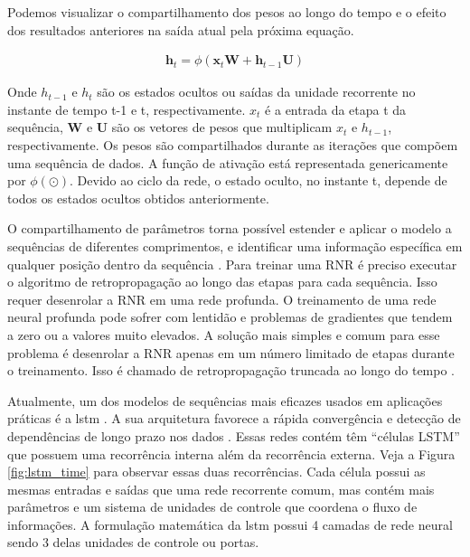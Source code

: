 Podemos visualizar o compartilhamento dos pesos ao longo do tempo e o efeito dos resultados anteriores na saída atual pela próxima equação. 

\begin{equation}
\label{eq:memoria}
\begin{aligned}
\textbf{h}_{t} =  \phi( \textbf{x}_{t} \textbf{W} + \textbf{h}_{t-1} \textbf{U}) 
\end{aligned}
\end{equation}

Onde  $h_{t-1}$ e $h_{t}$ são os estados ocultos ou saídas da unidade recorrente no instante de tempo t-1 e t, respectivamente.  $x_{t}$ é a entrada da etapa  t da sequência, $\textbf{W}$ e $\textbf{U}$ são os vetores de pesos que multiplicam $x_{t}$ e $h_{t-1}$, respectivamente. Os pesos são compartilhados durante as iterações que compõem uma sequência de dados. A função de ativação está representada genericamente por $\phi \left( \odot \right)$. Devido ao ciclo da rede, o estado oculto, no instante t, depende de todos os estados ocultos obtidos anteriormente.  

O compartilhamento de parâmetros torna possível estender e aplicar o modelo a sequências de diferentes comprimentos, e identificar uma informação específica em qualquer posição dentro da sequência \cite{Goodfellow2016}. 
Para treinar uma RNR é preciso executar o algoritmo de retropropagação ao longo das etapas para cada sequência. Isso requer desenrolar a RNR em uma rede profunda. O treinamento de uma rede neural profunda pode sofrer com lentidão e problemas de gradientes que tendem a zero ou a valores muito elevados. A solução mais simples e comum para esse problema é desenrolar a RNR apenas em um número limitado de etapas durante o treinamento. Isso é chamado de retropropagação truncada ao longo do tempo \cite{geron2017hands}.

Atualmente, um dos modelos de sequências mais eficazes usados em aplicações práticas é a \gls{lstm} \cite{lstm}. A sua arquitetura favorece a rápida convergência e detecção de dependências de longo prazo nos dados \cite{geron2017hands}.
Essas redes contém  têm ``células LSTM'' que possuem uma recorrência interna além da recorrência externa. Veja a Figura \ref{fig:lstm_time} para observar essas duas recorrências. Cada célula possui as mesmas entradas e saídas que uma rede recorrente comum, mas contém mais parâmetros e um sistema de unidades de controle que coordena o fluxo de informações.  A formulação matemática da \acrshort{lstm} possui 4 camadas de rede neural sendo 3 delas unidades de controle ou portas. 

